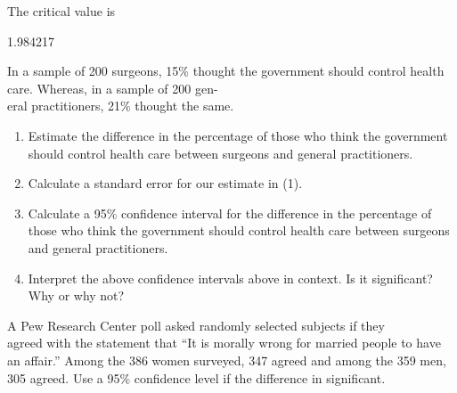 \documentclass[11pt, chapterprefix=true]{scrbook}\usepackage[]{graphicx}\usepackage[]{color}
\begin{document}
\begin{exercises}
\begin{solution}
   The critical value is


  1.984217

  \end{solution}

  \begin{exercise} %

In a sample of 200 surgeons, 15\% thought the government should control health care.  Whereas, in a sample of 200 gen- \\ eral practitioners, 21\% thought the same.

\begin{enumerate}
\item Estimate the difference in the percentage of those who think the government should control health care between surgeons and general practitioners.
\item Calculate a standard error for our estimate in (1).
\item Calculate a 95\% confidence interval for the difference in the percentage of those who think the government should control health care between surgeons and general practitioners.
\item Interpret the above confidence intervals above in context.  Is it significant? Why or why not?
\end{enumerate}
  \end{exercise}


  \begin{exercise} %

A Pew Research Center poll asked randomly selected subjects if they \\ agreed with the statement that ``It is morally wrong for married people to have an affair.''  Among the 386 women surveyed, 347 agreed and among the 359 men, 305 agreed.  Use a 95\% confidence level if the difference in significant.


\end{exercise}
\end{exercises}
\end{document}
